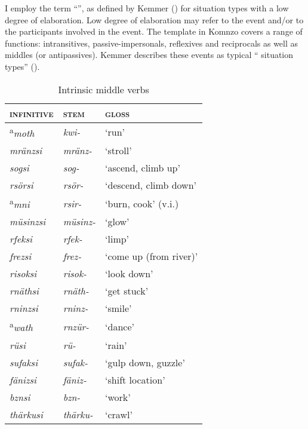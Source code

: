I employ the term ``'', as defined by Kemmer (\citeyear[207-210]{Kemmer:1993wda}) for situation types with a low degree of elaboration. Low degree of elaboration may refer to the event and/or to the participants involved in the event. The  template in Komnzo covers a range of functions: intransitives, passive-impersonals, reflexives and reciprocals as well as  middles (or antipassives). Kemmer describes these events as typical `` situation types'' (\citeyear[15]{Kemmer:1993wda}).

\begin{table}[H]
\caption{Intrinsic middle verbs}
\label{intrinsicmiddleverbs}
	\begin{tabular}{lll}
		\lsptoprule
		\textsc{infinitive} & \Ext{} \textsc{stem}		& \textsc{gloss}\\  \hline
		\textsuperscript{a}\emph{moth}		& \emph{kwi-}				& `run'\\
		\emph{mränzsi}		& \emph{mränz-}				& `stroll'\\
		\emph{sogsi}		& \emph{sog-}				& `ascend, climb up'\\
		\emph{rsörsi}		& \emph{rsör-}				& `descend, climb down'\\
		\textsuperscript{a}\emph{mni}		& \emph{rsir-}				& `burn, cook' (v.i.)\\
		\emph{müsinzsi}		& \emph{müsinz-}			& `glow'\\
		\emph{rfeksi}		& \emph{rfek-}				& `limp'\\
		\emph{frezsi}		& \emph{frez-}				& `come up (from river)'\\
		\emph{risoksi}		& \emph{risok-}				& `look down'\\
		\emph{rnäthsi}		& \emph{rnäth-}				& `get stuck'\\
		\emph{rninzsi}		& \emph{rninz-}				& `smile'\\
		\textsuperscript{a}\emph{wath}		& \emph{rnzür-}				& `dance'\\
		\emph{rüsi}			& \emph{rü-}				& `rain'\\
		\emph{sufaksi}		& \emph{sufak-}				& `gulp down, guzzle'\\
		\emph{fänizsi}		& \emph{fäniz-}				& `shift location'\\
		\emph{bznsi}		& \emph{bzn-}				& `work'\\
		\emph{thärkusi}		& \emph{thärku-}			& `crawl'\\

\end{tabular}
\end{table}
